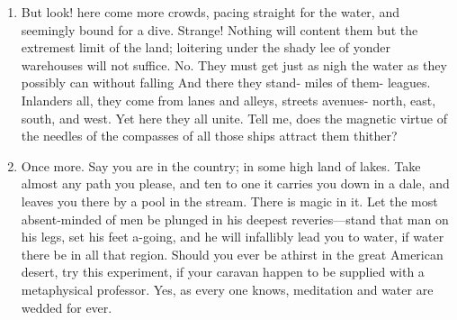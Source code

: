 \documentclass{../armymemo}
\begin{document}
\begin{enumerate}
\begin{enumerate}
  \item But look! here come more crowds, pacing straight for the water, and seemingly
    bound for a dive. Strange! Nothing will content them but the extremest limit of
    the land; loitering under the shady lee of yonder warehouses will not suffice.
    No. They must get just as nigh the water as they possibly can without falling
    And there they stand- miles of them- leagues. Inlanders all, they come from
    lanes and alleys, streets avenues- north, east, south, and west. Yet here they
    all unite. Tell me, does the magnetic virtue of the needles of the compasses of
    all those ships attract them thither?

  \item Once more. Say you are in the country; in some high land of lakes. Take
    almost any path you please, and ten to one it carries you down in a dale,
    and leaves you there by a pool in the stream. There is magic in it. Let the
    most absent-minded of men be plunged in his deepest reveries—stand that man
    on his legs, set his feet a-going, and he will infallibly lead you to water,
    if water there be in all that region.  Should you ever be athirst in the
    great American desert, try this experiment, if your caravan happen to be
    supplied with a metaphysical professor. Yes, as every one knows, meditation
    and water are wedded for ever.


\end{enumerate}
\end{enumerate}
\end{document}

